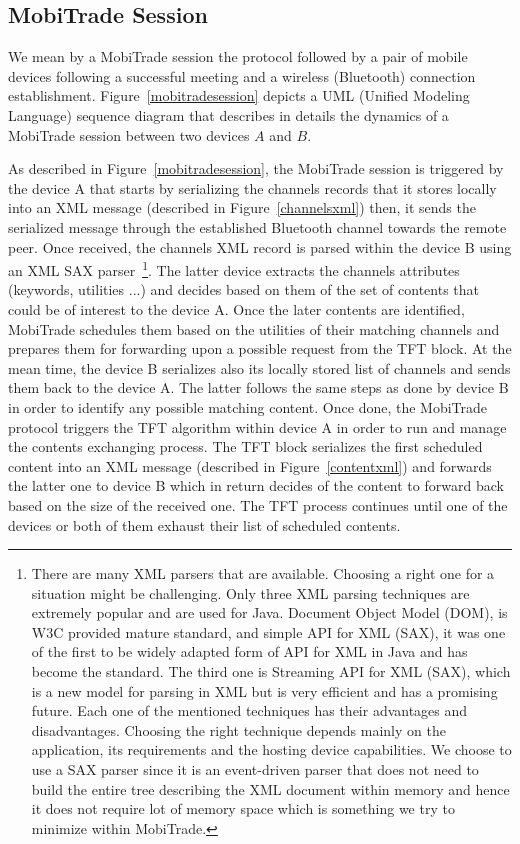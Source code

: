 \subsection{MobiTrade Session}
\label{MobiTrade-session}

We mean by a MobiTrade session the protocol followed by a pair of mobile devices following a successful meeting and a wireless (Bluetooth) connection establishment. Figure~\ref{mobitradesession} depicts a UML (Unified Modeling Language) sequence diagram that describes in details the dynamics of a MobiTrade session between two devices $A$ and $B$. 

As described in Figure~\ref{mobitradesession}, the MobiTrade session is triggered by the device A that starts by serializing the channels records that it stores locally into an XML message (described in Figure~\ref{channelsxml}) then, it sends the serialized message through the established Bluetooth channel towards the remote peer. Once received, the channels XML record is parsed within the device B using an XML SAX parser~\footnote{There are many XML parsers that are available. Choosing a right one for a situation might be challenging. Only three XML parsing techniques are extremely popular and are used for Java. Document Object Model (DOM), is W3C provided mature standard, and simple API for XML (SAX), it was one of the first to be widely adapted form of API for XML in Java and has become the standard. The third one is Streaming API for XML (SAX), which is a new model for parsing in XML but is very efficient and has a promising future. Each one of the mentioned techniques has their advantages and disadvantages. Choosing the right technique depends mainly on the application, its requirements and the hosting device capabilities. We choose to use a SAX parser since it is an event-driven parser that does not need to build the entire tree describing the XML document within memory and hence it does not require lot of memory space which is something we try to minimize within MobiTrade.}. The latter device extracts the channels attributes (keywords, utilities ...) and decides based on them of the set of contents that could be of interest to the device A. Once the later contents are identified, MobiTrade schedules them based on the utilities of their matching channels and prepares them for forwarding upon a possible request from the TFT block. At the mean time, the device B serializes also its locally stored list of channels and sends them back to the device A. The latter follows the same steps as done by device B in order to identify any possible matching content. Once done, the MobiTrade protocol triggers the TFT algorithm within device A in order to run and manage the contents exchanging process. The TFT block serializes the first scheduled content into an XML message (described in Figure~\ref{contentxml}) and forwards the latter one to device B which in return decides of the content to forward back based on the size of the received one. The TFT process continues until one of the devices or both of them exhaust their list of scheduled contents. 

